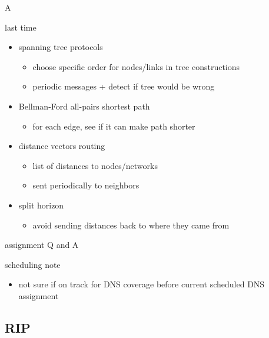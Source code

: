 \date{}
\title{}
\date{}

\begin{frame}
    \titlepage
\end{frame}A

\begin{frame}{last time}
    \begin{itemize}
    \item spanning tree protocols
        \begin{itemize}
        \item choose specific order for nodes/links in tree constructions
        \item periodic messages + detect if tree would be wrong
        \end{itemize}
    \item Bellman-Ford all-pairs shortest path
        \begin{itemize}
        \item for each edge, see if it can make path shorter
        \end{itemize}
    \item distance vectors routing
        \begin{itemize}
        \item list of distances to nodes/networks
        \item sent periodically to neighbors
        \end{itemize}
    \item split horizon
        \begin{itemize}
        \item avoid sending distances back to where they came from
        \end{itemize}
    \end{itemize}
\end{frame}

\begin{frame}{assignment Q and A}
\end{frame}

\begin{frame}{scheduling note}
    \begin{itemize}
    \item not sure if on track for DNS coverage before current scheduled DNS assignment
    \end{itemize}
\end{frame}

\subsection{RIP}



